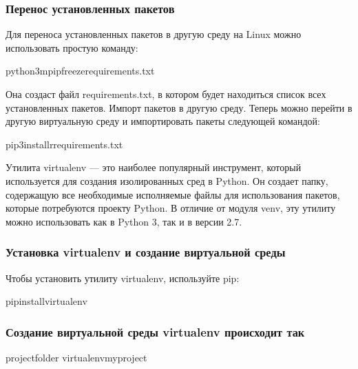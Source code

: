 \documentclass[letterpaper,10pt,russian]{sphinxmanual}
\begin{document}
\subsubsection{Перенос установленных пакетов}
\label{\detokenize{educational_materials/path_venv/content:id3}}
\sphinxAtStartPar
Для переноса установленных пакетов в другую среду на Linux можно использовать простую команду:

\begin{sphinxVerbatim}[commandchars=\\\{\}]
\PYGZdl{}python3\PYGZhy{}mpipfreeze\PYGZgt{}requirements.txt
\end{sphinxVerbatim}

\sphinxAtStartPar
Она создаст файл requirements.txt, в котором будет находиться список всех установленных пакетов.
Импорт пакетов в другую среду. Теперь можно перейти в другую виртуальную среду и импортировать пакеты следующей командой:

\begin{sphinxVerbatim}[commandchars=\\\{\}]
\PYGZdl{}pip3install\PYGZhy{}rrequirements.txt
\end{sphinxVerbatim}

\sphinxAtStartPar
{}

\sphinxAtStartPar
Утилита virtualenv — это наиболее популярный инструмент, который используется для создания изолированных сред в Python. Он создает папку, содержащую все необходимые исполняемые файлы для использования пакетов, которые потребуются проекту Python. В отличие от модуля venv, эту утилиту можно использовать как в Python 3, так и в версии 2.7.


\subsubsection{Установка virtualenv и создание виртуальной среды}
\label{\detokenize{educational_materials/path_venv/content:id4}}
\sphinxAtStartPar
Чтобы установить утилиту virtualenv, используйте pip:

\begin{sphinxVerbatim}[commandchars=\\\{\}]
\PYGZdl{}pipinstallvirtualenv
\end{sphinxVerbatim}


\subsubsection{Создание виртуальной среды virtualenv происходит так}
\label{\detokenize{educational_materials/path_venv/content:id5}}
\begin{sphinxVerbatim}[commandchars=\\\{\}]
\PYGZdl{}project\PYGZus{}folder
\PYGZdl{}virtualenvmyproject
\end{sphinxVerbatim}
\end{document}
